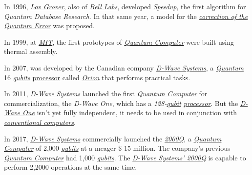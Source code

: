 \documentclass[conference]{IEEEtran}
\begin{document}
\vspace{4pt}

In 1996, \href{https://en.wikipedia.org/wiki/Lov_Grover}{\textit{Lov Grover}}, also of \href{https://en.wikipedia.org/wiki/Bell_Labs}{\textit{Bell Labs}}, developed \href{https://en.wikipedia.org/wiki/Amdahl\%27s_law}{\textit{Speedup}}, the first algorithm for \textit{Quantum Database Research}. In that same year, a model for the \href{https://en.wikipedia.org/wiki/Quantum_error_correction}{\textit{correction of the Quantum Error}} was proposed.

\vspace{4pt}

In 1999, at \href{https://en.wikipedia.org/wiki/Massachusetts_Institute_of_Technology}{\textit{MIT}}, the first prototypes of \href{https://en.wikipedia.org/wiki/Quantum_computing}{\textit{Quantum Computer}} were built using thermal assembly.

\vspace{4pt}

In 2007, was developed by the Canadian company \href{https://en.wikipedia.org/wiki/D-Wave_Systems}{\textit{D-Wave Systems}}, a \href{https://en.wikipedia.org/wiki/Quantum}{\textit{Quantum}} 16 \href{https://en.wikipedia.org/wiki/Qubit}{\textit{qubits}} \href{https://en.wikipedia.org/wiki/Processor_(computing)}{processor} called \href{https://www.eetimes.com/document.asp?doc_id=1165219#}{\textit{Orion}} that performs practical tasks.

\vspace{4pt}

In 2011, \href{https://en.wikipedia.org/wiki/D-Wave_Systems}{\textit{D-Wave Systems}} launched the first \href{https://en.wikipedia.org/wiki/Quantum_computing}{\textit{Quantum Computer}} for commercialization, the \textit{D-Wave One}, which has a \textit{128-\href{https://en.wikipedia.org/wiki/Qubit}{qubit} \href{https://en.wikipedia.org/wiki/Processor_(computing)}{processor}}. But the \href{https://en.wikipedia.org/wiki/D-Wave_Systems#D-Wave_One}{\textit{D-Wave One}} isn't yet fully independent, it needs to be used in conjunction with \href{https://en.wikipedia.org/wiki/Von_Neumann_architecture}{\textit{conventional computers}}.

\vspace{4pt}

In 2017, \href{https://en.wikipedia.org/wiki/D-Wave_Systems}{\textit{D-Wave Systems}} commercially launched the \href{https://www.dwavesys.com/d-wave-two-system}{\textit{2000Q}}, a \href{https://en.wikipedia.org/wiki/Quantum_computing}{\textit{Quantum Computer}} of 2,000 \href{https://en.wikipedia.org/wiki/Qubit}{\textit{qubits}} at a meager \$ 15 million. The company's previous \href{https://en.wikipedia.org/wiki/Quantum_computing}{\textit{Quantum Computer}} had 1,000 \href{https://en.wikipedia.org/wiki/Qubit}{\textit{qubits}}. The \href{https://www.dwavesys.com/d-wave-two-system}{\textit{D-Wave Systems' 2000Q}} is capable to perform 2,2000 operations at the same time.
\end{document}
